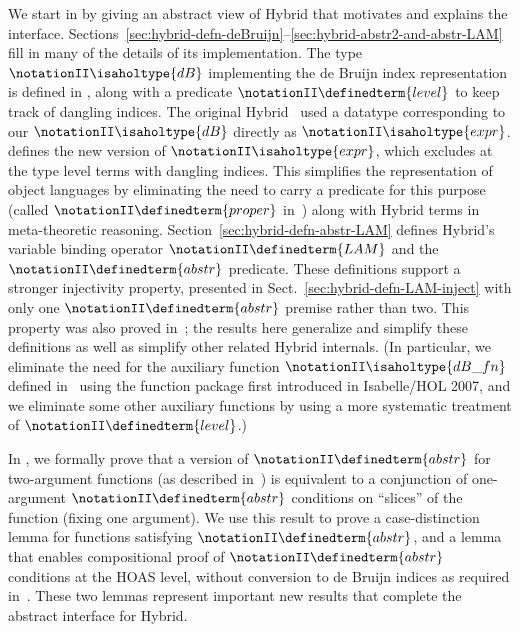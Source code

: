 \documentclass[copyright,creativecommons]{eptcs}
\begin{document}
We start in  by giving an abstract view
of Hybrid that motivates and explains the interface.
Sections~\ref{sec:hybrid-defn-deBruijn}--\ref{sec:hybrid-abstr2-and-abstr-LAM}
fill in many of the details of its implementation.
The type \(\notationII \isaholtype{dB}\) implementing the de Bruijn index representation is
defined in , along with a
predicate \(\notationII \definedterm{level}\) to keep track of dangling indices.  The original
Hybrid~\cite{ambler/crole/momigliano:2002} used a datatype
corresponding to our \(\notationII \isaholtype{dB}\) directly as \(\notationII \isaholtype{expr}\).
 defines the new version of
\(\notationII \isaholtype{expr}\), which excludes at the type level terms with dangling
indices. This simplifies the representation of object languages by
eliminating the need to carry a predicate for this purpose (called
\(\notationII \definedterm{proper} \) in~\cite{ambler/crole/momigliano:2002}) along with
Hybrid terms in meta-theoretic reasoning.
Section~\ref{sec:hybrid-defn-abstr-LAM} defines Hybrid's variable
binding operator \(\notationII \definedterm{LAM}\) and the \(\notationII \definedterm{abstr}\) predicate.  These
definitions support a stronger injectivity property, presented in
Sect.~\ref{sec:hybrid-defn-LAM-inject} with only one \(\notationII \definedterm{abstr}\)
premise rather than two.  This property was also proved
in~\cite{momigliano/martin/felty:2008}; the results here generalize
and simplify these definitions as well as simplify other related
Hybrid internals.  (In particular, we eliminate the need for the
auxiliary function \(\notationII \isaholtype{dB\_fn}\) defined
in~\cite{momigliano/martin/felty:2008} using the function package first
introduced in Isabelle/HOL 2007, and we eliminate some other auxiliary
functions by using a more systematic treatment of \(\notationII \definedterm{level}\).)

In , we formally prove that
a version of \(\notationII \definedterm{abstr}\) for two-argument functions (as described
in~\cite{momigliano/ambler/crole:2002}) is equivalent to a conjunction
of one-argument \(\notationII \definedterm{abstr}\) conditions on ``slices'' of the function
(fixing one argument).  We use this result to prove a case-distinction
lemma for functions satisfying \(\notationII \definedterm{abstr}\), and a lemma that enables
compositional proof of \(\notationII \definedterm{abstr}\) conditions at the HOAS level,
without conversion to de Bruijn indices as required
in~\cite{ambler/crole/momigliano:2002}.  These two lemmas represent
important new results that complete the abstract interface for Hybrid.
\end{document}
